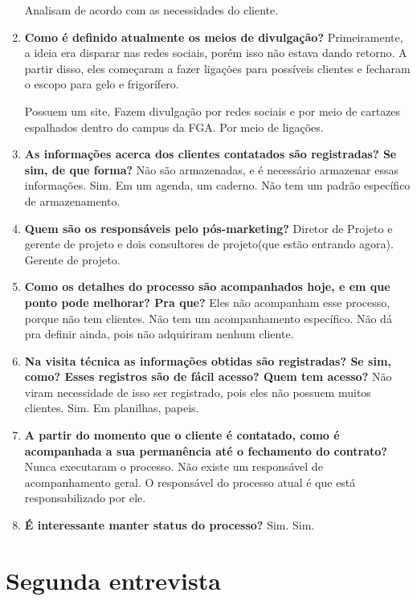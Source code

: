\begin{enumerate}
		\subitem Analisam de acordo com as necessidades do cliente.
	\item \textbf{Como é definido atualmente os meios de divulgação?}
		\subitem Primeiramente, a ideia era disparar nas redes sociais, porém isso não estava dando retorno. A partir disso, eles começaram a fazer ligações para possíveis clientes e fecharam o escopo para gelo e frigorífero. 

		\subitem Possuem um site. Fazem divulgação por redes sociais e por meio de cartazes espalhados dentro do campus da FGA. Por meio de ligações.
		
	\item \textbf{As informações acerca dos clientes contatados são registradas? Se sim, de que forma?}
		\subitem Não são armazenadas, e é necessário armazenar essas informações.
		\subitem Sim. Em um agenda, um caderno. Não tem um padrão específico de armazenamento.
	\item \textbf{Quem são os responsáveis pelo pós-marketing?}
		\subitem Diretor de Projeto e gerente de projeto e dois consultores de projeto(que estão entrando agora).
		\subitem Gerente de projeto.
	\item \textbf{Como os detalhes do processo são acompanhados hoje, e em que ponto pode melhorar? Pra que?}
		\subitem Eles não acompanham esse processo, porque não tem clientes.
		\subitem Não tem um acompanhamento específico. Não dá pra definir ainda, pois não adquiriram nenhum cliente.
	\item \textbf{Na visita técnica as informações obtidas são registradas? Se sim, como? Esses registros são de fácil acesso? Quem tem acesso?}
		\subitem Não viram necessidade de isso ser registrado, pois eles não possuem muitos clientes.
		\subitem Sim. Em planilhas, papeis.
	\item \textbf{A partir do momento que o cliente é contatado, como é acompanhada a sua permanência até o fechamento do contrato?}
		\subitem Nunca executaram o processo.
		\subitem Não existe um responsável de acompanhamento geral. O responsável do processo atual é que está responsabilizado por ele.
	\item \textbf{É interessante manter status do processo?}
		\subitem Sim.
		\subitem Sim.
\end{enumerate}

\section{Segunda entrevista}

